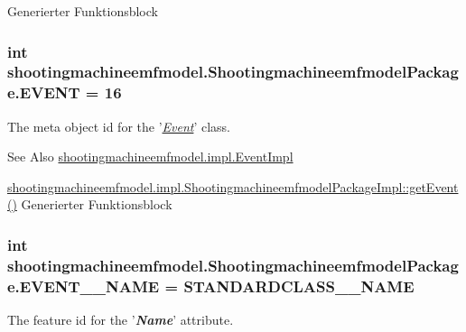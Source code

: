 Generierter Funktionsblock \hypertarget{interfaceshootingmachineemfmodel_1_1_shootingmachineemfmodel_package_a17975c136ffb7a00885baefd2d0a6f3c}{
\subsubsection[{E\-V\-E\-N\-T}]{\setlength{\rightskip}{0pt plus 5cm}int shootingmachineemfmodel.\-Shootingmachineemfmodel\-Package.\-E\-V\-E\-N\-T = 16}}\label{interfaceshootingmachineemfmodel_1_1_shootingmachineemfmodel_package_a17975c136ffb7a00885baefd2d0a6f3c}
The meta object id for the '\hyperlink{classshootingmachineemfmodel_1_1impl_1_1_event_impl}{{\itshape Event}}' class.

\begin{DoxySeeAlso}{See Also}
\hyperlink{classshootingmachineemfmodel_1_1impl_1_1_event_impl}{shootingmachineemfmodel.\-impl.\-Event\-Impl} 

\hyperlink{classshootingmachineemfmodel_1_1impl_1_1_shootingmachineemfmodel_package_impl_ab8a65c25b50ad542b99ae48c8e84e808}{shootingmachineemfmodel.\-impl.\-Shootingmachineemfmodel\-Package\-Impl\-::get\-Event()} Generierter Funktionsblock 
\end{DoxySeeAlso}
\hypertarget{interfaceshootingmachineemfmodel_1_1_shootingmachineemfmodel_package_adfb3c7d591083a0612fbcc21fc2b44fa}{
\subsubsection[{E\-V\-E\-N\-T\-\_\-\-\_\-\-N\-A\-M\-E}]{\setlength{\rightskip}{0pt plus 5cm}int shootingmachineemfmodel.\-Shootingmachineemfmodel\-Package.\-E\-V\-E\-N\-T\-\_\-\-\_\-\-N\-A\-M\-E = {\bf S\-T\-A\-N\-D\-A\-R\-D\-C\-L\-A\-S\-S\-\_\-\-\_\-\-N\-A\-M\-E}}}\label{interfaceshootingmachineemfmodel_1_1_shootingmachineemfmodel_package_adfb3c7d591083a0612fbcc21fc2b44fa}
The feature id for the '{\itshape {\bfseries Name}}' attribute.

